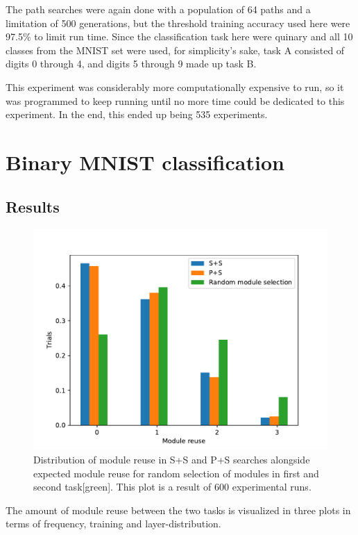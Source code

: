 The path searches were again done with a population of 64 paths and a limitation of 500 generations, but the threshold training accuracy used here were 97.5\% to limit run time. 
Since the classification task here were quinary and all 10 classes from the MNIST set were used, for simplicity's sake, task A consisted of digits 0 through 4, and digits 5 through 9 made up task B. 

This experiment was considerably more computationally expensive to run, so it was programmed to keep running until no more time could be dedicated to this experiment. In the end, this ended up being 535 experiments. 


\section{Binary MNIST classification}
\label{exp1:results.binary}

\subsection{Results}
\label{exp1:BIN.results}
\begin{figure}[t]
    \includegraphics[width=\textwidth]{Chapters/4.Experiments/exp1/figures/BIN_module_reuse_bargraph.pdf}
    \caption{Distribution of module reuse in S+S and P+S searches alongside expected module reuse for random selection of modules in first and second task[green]. This plot is a result of 600 experimental runs.}
    \label{fig:binMNIST.hist}
\end{figure}

The amount of module reuse between the two tasks is visualized in three plots in terms of frequency, training and layer-distribution.

